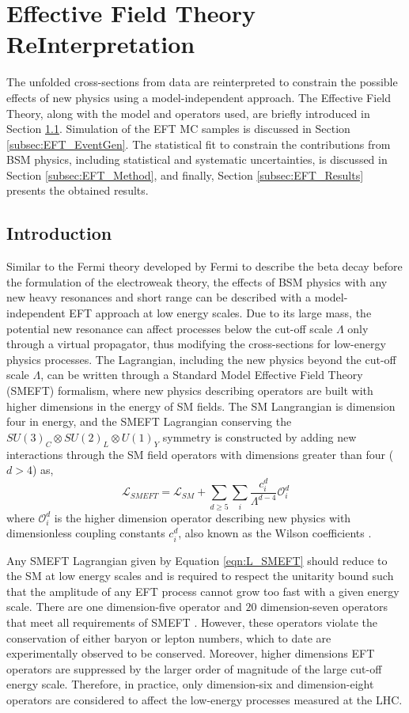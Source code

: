 \section{Effective Field Theory ReInterpretation}
\label{sec:EFT}
The unfolded cross-sections from data are reinterpreted to constrain the possible effects of new physics using a model-independent approach. The Effective Field Theory, along with the model and operators used, are briefly introduced in Section \ref{subsec:EFT_Intro}. Simulation of the EFT MC samples is discussed in Section \ref{subsec:EFT_EventGen}. The statistical fit to constrain the contributions from BSM physics, including statistical and systematic uncertainties, is discussed in Section \ref{subsec:EFT_Method}, and finally, Section \ref{subsec:EFT_Results} presents the obtained results. 

\subsection{Introduction}
\label{subsec:EFT_Intro}
Similar to the Fermi theory developed by Fermi to describe the beta decay before the formulation of the electroweak theory, the effects of BSM physics with any new heavy resonances and short range can be described with a model-independent EFT approach at low energy scales. Due to its large mass, the potential new resonance can affect processes below the cut-off scale $\Lambda$ only through a virtual propagator, thus modifying the cross-sections for low-energy physics processes. The Lagrangian, including the new physics beyond the cut-off scale $\Lambda$, can be written through a Standard Model Effective Field Theory (SMEFT) formalism, where new physics describing operators are built with higher dimensions in the energy of SM fields. The SM Langrangian is dimension four in energy, and the SMEFT Lagrangian conserving the $SU(3)_{C} \otimes SU(2)_{L} \otimes U(1)_{Y}$ symmetry is constructed by adding new interactions through the SM field operators with dimensions greater than four ($d>4$) as, 
\begin{equation}
\label{eqn:L_SMEFT}
\mathcal{L}_{SMEFT} = \mathcal{L}_{SM} + \sum_{d \geq 5}\sum_{i}\frac{c_{i}^{d}}{\Lambda^{d-4}}\mathcal{O}_{i}^{d}
\end{equation}
where $\mathcal{O}_{i}^{d}$ is the higher dimension operator describing new physics with dimensionless coupling constants $c_{i}^{d}$, also known as the Wilson coefficients \cite{SMEFT}. 

Any SMEFT Lagrangian given by Equation \ref{eqn:L_SMEFT} should reduce to the SM at low energy scales and is required to respect the unitarity bound such that the amplitude of any EFT process cannot grow too fast with a given energy scale. There are one dimension-five operator and $20$ dimension-seven operators that meet all requirements of SMEFT \cite{SMEFT}\cite{Dim7_EFT}. However, these operators violate the conservation of either baryon or lepton numbers, which to date are experimentally observed to be conserved. Moreover, higher dimensions EFT operators are suppressed by the larger order of magnitude of the large cut-off energy scale. Therefore, in practice, only dimension-six and dimension-eight operators are considered to affect the low-energy processes measured at the LHC.

